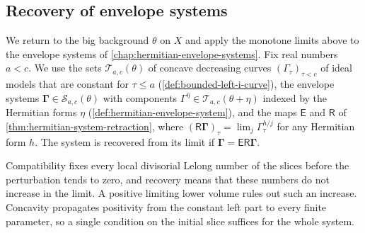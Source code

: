 \subsection{Recovery of envelope systems}
\label{subsec:positive-system-recovery}

We return to the big background $\theta$ on $X$ and apply the monotone limits above to the envelope systems of \cref{chap:hermitian-envelope-systems}. Fix real numbers $a<c$. We use the sets $\mathscr T_{a,c}(\theta)$ of concave decreasing curves $(\Gamma_\tau)_{\tau<c}$ of ideal models that are constant for $\tau\leq a$ (\cref{def:bounded-left-i-curve}), the envelope systems $\boldsymbol\Gamma\in\mathscr S_{a,c}(\theta)$ with components $\Gamma^\eta\in\mathscr T_{a,c}(\theta+\eta)$ indexed by the Hermitian forms $\eta$ (\cref{def:hermitian-envelope-system}), and the maps $\mathsf E$ and $\mathsf R$ of \cref{thm:hermitian-system-retraction}, where $(\mathsf R\boldsymbol\Gamma)_\tau=\lim_j\Gamma^{h/j}_\tau$ for any Hermitian form $h$. The system is recovered from its limit if $\boldsymbol\Gamma=\mathsf E\mathsf R\boldsymbol\Gamma$.

Compatibility fixes every local divisorial Lelong number of the slices before the perturbation tends to zero, and recovery means that these numbers do not increase in the limit. A positive limiting lower volume rules out such an increase. Concavity propagates positivity from the constant left part to every finite parameter, so a single condition on the initial slice suffices for the whole system.

